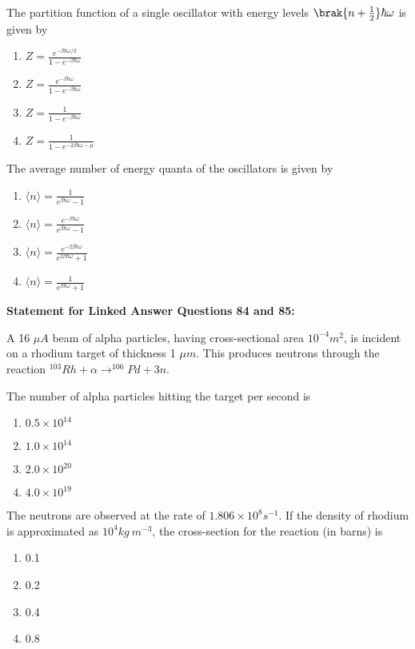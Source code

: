 \item The partition function of a single oscillator with energy levels $\brak{n+\frac{1}{2}}\hbar\omega$ is given by
\begin{multicols}{4}
\begin{enumerate}
\item $Z=\frac{e^{-\beta\hbar\omega/2}}{1-e^{-\beta\hbar\omega}}$
\item $Z=\frac{e^{-\beta\hbar\omega}}{1-e^{-\beta\hbar\omega}}$
\item $Z=\frac{1}{1-e^{-\beta\hbar\omega}}$
\item $Z=\frac{1}{1-e^{-2\beta\hbar\omega-\mu}}$
\end{enumerate}
\end{multicols}

\item The average number of energy quanta of the oscillators is given by
\begin{multicols}{4}
\begin{enumerate}
\item $\langle n \rangle = \frac{1}{e^{\beta\hbar\omega}-1}$
\item $\langle n \rangle = \frac{e^{-\beta\hbar\omega}}{e^{\beta\hbar\omega}-1}$
\item $\langle n \rangle = \frac{e^{-2\beta\hbar\omega}}{e^{2\beta\hbar\omega}+1}$
\item $\langle n \rangle = \frac{1}{e^{\beta\hbar\omega}+1}$
\end{enumerate}
\end{multicols}

 \textbf{Statement for Linked Answer Questions 84 and 85:}

A 16 $\mu A$ beam of alpha particles, having cross-sectional area $10^{-4}m^{2}$, is incident on a rhodium target of thickness 1 $\mu m$. This produces neutrons through the reaction $^{103}Rh + \alpha \rightarrow ^{106}Pd + 3n$.

\item The number of alpha particles hitting the target per second is
\begin{multicols}{4}
\begin{enumerate}
\item $0.5\times10^{14}$
\item $1.0\times10^{14}$
\item $2.0\times10^{20}$
\item $4.0\times10^{19}$
\end{enumerate}
\end{multicols}

\item The neutrons are observed at the rate of $1.806\times10^{8}s^{-1}$. If the density of rhodium is approximated as $10^{4}kg~m^{-3}$, the cross-section for the reaction (in barns) is
\begin{multicols}{4}
\begin{enumerate}
\item 0.1
\item 0.2
\item 0.4
\item 0.8
\end{enumerate}
\end{multicols}

